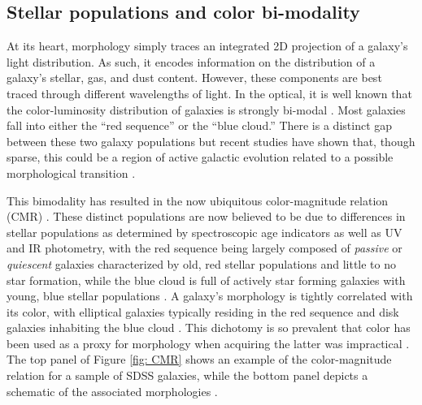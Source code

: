 \subsection{Stellar populations and color bi-modality}
At its heart, morphology simply traces an integrated 2D projection of a galaxy's light distribution. As such, it encodes information on the distribution of a galaxy's stellar, gas, and dust content. However, these components are best traced through different wavelengths of light. In the optical, it is well known that the color-luminosity distribution of galaxies is strongly bi-modal \citep{Baldry2004b}. Most galaxies fall into either the ``red sequence'' or the ``blue cloud.'' There is a distinct gap between these two galaxy populations but recent studies have shown that, though sparse, this could be a region of active galactic evolution related to a possible morphological transition \citep{Schawinski2007}.

This bimodality has resulted in the now ubiquitous color-magnitude relation (CMR) \citep{Baldry2004a, Bell2004}. These distinct populations are now believed to be due to differences in stellar populations as determined by spectroscopic age indicators as well as UV and IR photometry, with the red sequence being largely composed of \textit{passive} or \textit{quiescent} galaxies characterized by old, red stellar populations and little to no star formation, while the blue cloud is full of actively star forming galaxies with young, blue stellar populations \citep{Brinchmann2004,Kauffman2003,Salim2007,Schiminovich2007}. A galaxy's morphology is tightly correlated with its color, with elliptical galaxies typically residing in the red sequence and disk galaxies inhabiting the blue cloud \citep[e.g.,][]{Strateva2001,Baldry2004b, Cirasuolo2007, Lee2013, Taylor2015}.  This dichotomy is so prevalent that color has been used as a proxy for morphology when acquiring the latter was impractical \citep[e.g.,][]{Shen2003, Blanton2003c}.  The top panel of Figure \ref{fig: CMR} shows an example of the color-magnitude relation for a sample of SDSS galaxies, while the bottom panel depicts a schematic of the associated morphologies \citep[adapted from][]{Kormendy2012}. 



